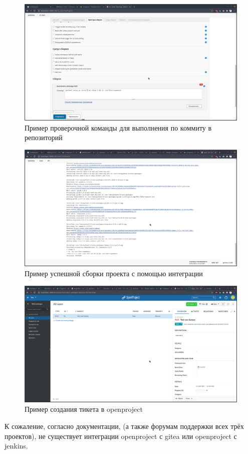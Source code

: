 \documentclass[a4paper]{extarticle}
\begin{document}
\begin{figure}[H]
\includegraphics[width=\textwidth,height=\textheight,keepaspectratio]{shell.png}
\caption{Пример проверочной команды для выполнения по коммиту в репозиторий}
\end{figure}

\begin{figure}[H]
\includegraphics[width=\textwidth,height=\textheight,keepaspectratio]{suc_build.png}
\caption{Пример успешной сборки проекта с помощью интеграции}
\end{figure}

\begin{figure}[H]
\includegraphics[width=\textwidth,height=\textheight,keepaspectratio]{openproject.png}
\caption{Пример создания тикета в openproject}
\end{figure}

К сожаление, согласно документации, (а также  форумам поддержки всех трёх проектов), не существует интеграции openproject с gitea или openproject с jenkins.
\end{document}
